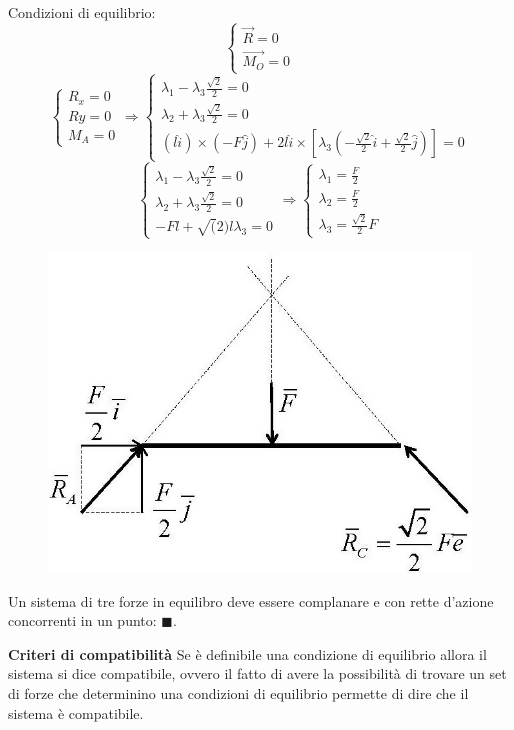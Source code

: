 \documentclass{article}
\begin{document}
\begin{adjustwidth}{2in}{}
Condizioni di equilibrio:\newline
\[
\begin{cases}
	\vec{R} = 0 \\
	\vec{M_{O}} = 0
\end{cases} 
\]
\[
\begin{cases}
	R_{x} = 0 \\
	R{y} = 0 \\
	M_{A} = 0
\end{cases} \Rightarrow \begin{cases}
\lambda_{1} - \lambda_{3}\frac{\sqrt{2}}{2} = 0 \\
\lambda_{2} + \lambda_{3}\frac{\sqrt{2}}{2} = 0 \\
(l\hat{i}) \times (-F\hat{j}) + 2l\hat{i} \times [\lambda_{3}(-\frac{\sqrt{2}}{2} \hat{i} + \frac{\sqrt{2}}{2} \hat{j})] = 0
\end{cases}
\]
\[\begin{cases}
	\lambda_{1} - \lambda_{3}\frac{\sqrt{2}}{2} = 0 \\
	\lambda_{2} + \lambda_{3}\frac{\sqrt{2}}{2} = 0 \\
	-Fl + \sqrt(2)l\lambda_{3} = 0
\end{cases} \Rightarrow \begin{cases}
\lambda_{1} = \frac{F}{2} \\
\lambda_{2} = \frac{F}{2} \\
\lambda_{3} = \frac{\sqrt{2}}{2}F
\end{cases}
\]
\begin{figure}[H]
	\centering
	\includegraphics[width=0.25\linewidth]{"immagini/1.PARTE1_Pagina_42"}
\end{figure}
Un sistema di tre forze in equilibro deve essere complanare e con rette d'azione concorrenti in un punto: $\blacksquare$. \newline

{\Large \textbf{Criteri di compatibilità}} \mbox{} \newline
Se è definibile una condizione di equilibrio allora il sistema si dice compatibile, ovvero il fatto di avere la possibilità di trovare un set di forze che determinino una condizioni di equilibrio permette di dire che il sistema è compatibile. 


\end{adjustwidth}
\end{document}
